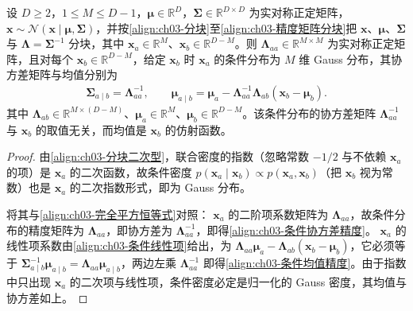 \documentclass[../../main.tex]{subfiles}
\begin{document}
\begin{proposition}\label{proposition:ch03-条件Gauss精度}
设 $D\geqslant2$，$1\leqslant M\leqslant D-1$，$\boldsymbol{\mu}\in\mathbb{R}^{D}$，$\boldsymbol{\Sigma}\in\mathbb{R}^{D\times D}$ 为实对称正定矩阵，$\boldsymbol{x}\sim\mathcal{N}(\boldsymbol{x}\mid\boldsymbol{\mu},\boldsymbol{\Sigma})$，并按\eqref{align:ch03-分块}至\eqref{align:ch03-精度矩阵分块}把 $\boldsymbol{x}$、$\boldsymbol{\mu}$、$\boldsymbol{\Sigma}$ 与 $\boldsymbol{\Lambda}=\boldsymbol{\Sigma}^{-1}$ 分块，其中 $\boldsymbol{x}_a\in\mathbb{R}^{M}$、$\boldsymbol{x}_b\in\mathbb{R}^{D-M}$。则 $\boldsymbol{\Lambda}_{aa}\in\mathbb{R}^{M\times M}$ 为实对称正定矩阵，且对每个 $\boldsymbol{x}_b\in\mathbb{R}^{D-M}$，给定 $\boldsymbol{x}_b$ 时 $\boldsymbol{x}_a$ 的条件分布为 $M$ 维 Gauss 分布，其协方差矩阵与均值分别为
\begin{align*}
\boldsymbol{\Sigma}_{a\mid b}=\boldsymbol{\Lambda}_{aa}^{-1},\qquad \boldsymbol{\mu}_{a\mid b}=\boldsymbol{\mu}_{a}-\boldsymbol{\Lambda}_{aa}^{-1}\boldsymbol{\Lambda}_{ab}(\boldsymbol{x}_{b}-\boldsymbol{\mu}_{b}).
\end{align*}
其中 $\boldsymbol{\Lambda}_{ab}\in\mathbb{R}^{M\times(D-M)}$、$\boldsymbol{\mu}_{a}\in\mathbb{R}^{M}$、$\boldsymbol{\mu}_{b}\in\mathbb{R}^{D-M}$。该条件分布的协方差矩阵 $\boldsymbol{\Lambda}_{aa}^{-1}$ 与 $\boldsymbol{x}_{b}$ 的取值无关，而均值是 $\boldsymbol{x}_{b}$ 的仿射函数。
\end{proposition}
\begin{proof}
由\eqref{align:ch03-分块二次型}，联合密度的指数（忽略常数 $-1/2$ 与不依赖 $\boldsymbol{x}_a$ 的项）是 $\boldsymbol{x}_{a}$ 的二次函数，故条件密度 $p(\boldsymbol{x}_{a}\mid\boldsymbol{x}_{b})\propto p(\boldsymbol{x}_{a},\boldsymbol{x}_{b})$（把 $\boldsymbol{x}_{b}$ 视为常数）也是 $\boldsymbol{x}_{a}$ 的二次指数形式，即为 Gauss 分布。

将其与\eqref{align:ch03-完全平方恒等式}对照： $\boldsymbol{x}_{a}$ 的二阶项系数矩阵为 $\boldsymbol{\Lambda}_{aa}$，故条件分布的精度矩阵为 $\boldsymbol{\Lambda}_{aa}$，即协方差为 $\boldsymbol{\Lambda}_{aa}^{-1}$，即得\eqref{align:ch03-条件协方差精度}。 $\boldsymbol{x}_{a}$ 的线性项系数由\eqref{align:ch03-条件线性项}给出，为 $\boldsymbol{\Lambda}_{aa}\boldsymbol{\mu}_{a}-\boldsymbol{\Lambda}_{ab}(\boldsymbol{x}_{b}-\boldsymbol{\mu}_{b})$，它必须等于 $\boldsymbol{\Sigma}_{a\mid b}^{-1}\boldsymbol{\mu}_{a\mid b}=\boldsymbol{\Lambda}_{aa}\boldsymbol{\mu}_{a\mid b}$，两边左乘 $\boldsymbol{\Lambda}_{aa}^{-1}$ 即得\eqref{align:ch03-条件均值精度}。由于指数中只出现 $\boldsymbol{x}_{a}$ 的二次项与线性项，条件密度必定是归一化的 Gauss 密度，其均值与协方差如上。
\end{proof}
\end{document}
